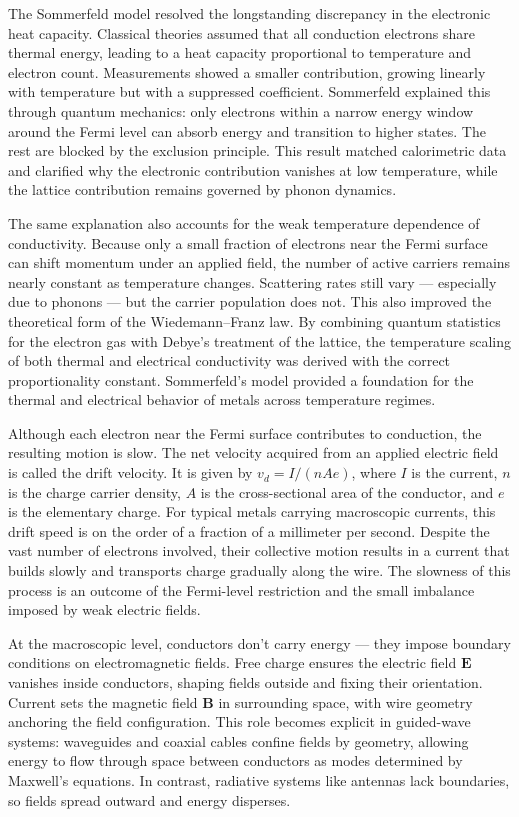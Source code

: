 The Sommerfeld model resolved the longstanding discrepancy in the electronic heat capacity. Classical theories assumed that all conduction electrons share thermal energy, leading to a heat capacity proportional to temperature and electron count. Measurements showed a smaller contribution, growing linearly with temperature but with a suppressed coefficient. Sommerfeld explained this through quantum mechanics: only electrons within a narrow energy window around the Fermi level can absorb energy and transition to higher states. The rest are blocked by the exclusion principle. This result matched calorimetric data and clarified why the electronic contribution vanishes at low temperature, while the lattice contribution remains governed by phonon dynamics.

The same explanation also accounts for the weak temperature dependence of conductivity. Because only a small fraction of electrons near the Fermi surface can shift momentum under an applied field, the number of active carriers remains nearly constant as temperature changes. Scattering rates still vary — especially due to phonons — but the carrier population does not. This also improved the theoretical form of the Wiedemann–Franz law. By combining quantum statistics for the electron gas with Debye's treatment of the lattice, the temperature scaling of both thermal and electrical conductivity was derived with the correct proportionality constant. Sommerfeld's model provided a foundation for the thermal and electrical behavior of metals across temperature regimes.

Although each electron near the Fermi surface contributes to conduction, the resulting motion is slow. The net velocity acquired from an applied electric field is called the drift velocity. It is given by $v_d = I / (n A e)$, where $I$ is the current, $n$ is the charge carrier density, $A$ is the cross-sectional area of the conductor, and $e$ is the elementary charge. For typical metals carrying macroscopic currents, this drift speed is on the order of a fraction of a millimeter per second. Despite the vast number of electrons involved, their collective motion results in a current that builds slowly and transports charge gradually along the wire. The slowness of this process is an outcome of the Fermi-level restriction and the small imbalance imposed by weak electric fields.

At the macroscopic level, conductors don't carry energy — they impose boundary conditions on electromagnetic fields. Free charge ensures the electric field $\mathbf{E}$ vanishes inside conductors, shaping fields outside and fixing their orientation. Current sets the magnetic field $\mathbf{B}$ in surrounding space, with wire geometry anchoring the field configuration. This role becomes explicit in guided-wave systems: waveguides and coaxial cables confine fields by geometry, allowing energy to flow through space between conductors as modes determined by Maxwell's equations. In contrast, radiative systems like antennas lack boundaries, so fields spread outward and energy disperses.

